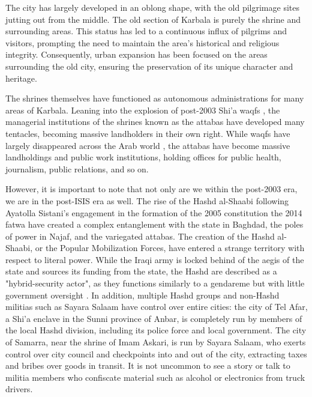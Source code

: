 The city has largely developed in an oblong shape, with the old pilgrimage sites jutting out from the middle. The old section of Karbala is purely the shrine and surrounding areas. This status has led to a continuous influx of pilgrims and visitors, prompting the need to maintain the area's historical and religious integrity. Consequently, urban expansion has been focused on the areas surrounding the old city, ensuring the preservation of its unique character and heritage.

The shrines themselves have functioned as autonomous administrations for many areas of Karbala. Leaning into the explosion of post-2003 Shi'a waqfs \cite{hamdan_development_2012}, the managerial institutions of the shrines known as the attabas have developed many tentacles, becoming massive landholders in their own right. While waqfs have largely disappeared across the Arab world \cite{moumtaz_gods_2021}, the attabas have become massive landholdings and public work institutions, holding offices for public health, journalism, public relations, and so on. 

However, it is important to note that not only are we within the post-2003 era, we are in the post-ISIS era as well. The rise of the Hashd al-Shaabi following Ayatolla Sistani's engagement in the formation of the 2005 constitution \cite{al-rahim_sistani_2005} the 2014 fatwa \cite{rudolf_battlefield_nodate}\cite{ann_wainscott_engaging_2019} have created a complex entanglement with the state in Baghdad, the poles of power in Najaf, and the variegated attabas. The creation of the Hashd al-Shaabi, or the Popular Mobilization Forces, have entered a strange territory with respect to literal power. While the Iraqi army is locked behind of the aegis of the state and sources its funding from the state, the Hashd are described as a "hybrid-security actor", as they functions similarly to a gendareme but with little government oversight \cite{cambanis_hybrid_2019} \cite{renad_mansour_popular_2018}. In addition, multiple Hashd groups and non-Hashd militias such as Sayara Salaam have control over entire cities: the city of Tel Afar, a Shi'a enclave in the Sunni province of Anbar, is completely run by members of the local Hashd division, including its police force and local government. The city of Samarra, near the shrine of Imam Askari, is run by Sayara Salaam, who exerts control over city council and checkpoints into and out of the city, extracting taxes and bribes over goods in transit. It is not uncommon to see a story or talk to militia members who confiscate material such as alcohol or electronics from truck drivers. 

